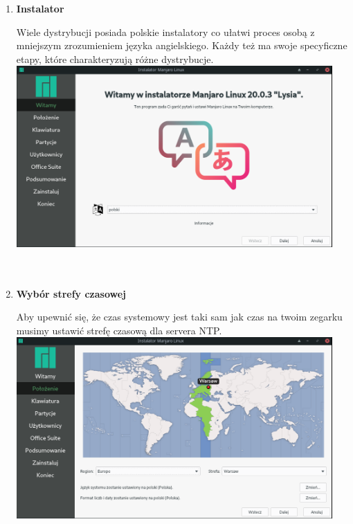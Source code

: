 \documentclass[10pt,a4paper]{article}
\begin{document}
\begin{enumerate}
\item \textbf{Instalator} \par
Wiele dystrybucji posiada polskie instalatory co ułatwi proces osobą z mniejszym zrozumieniem języka angielskiego. Każdy też ma swoje specyficzne etapy, które charakteryzują różne dystrybucje.\\

\includegraphics[width=0.95\textwidth, center]{manjaro_install3.png}\\\\\\

\item \textbf{Wybór strefy czasowej} \par
Aby upewnić się, że czas systemowy jest taki sam jak czas na twoim zegarku musimy ustawić strefę czasową dla servera NTP.\\

\includegraphics[width=0.95\textwidth, center]{manjaro_install4.png}\\\\\\




\end{enumerate}
\end{document}
